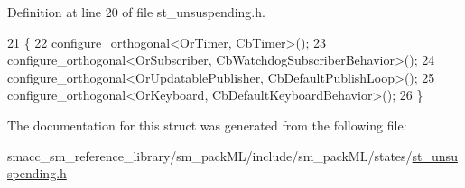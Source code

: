 Definition at line 20 of file st\+\_\+unsuspending.\+h.


\begin{DoxyCode}
21     \{
22         configure\_orthogonal<OrTimer, CbTimer>();   
23         configure\_orthogonal<OrSubscriber, CbWatchdogSubscriberBehavior>();
24         configure\_orthogonal<OrUpdatablePublisher, CbDefaultPublishLoop>();
25         configure\_orthogonal<OrKeyboard, CbDefaultKeyboardBehavior>();
26     \}
\end{DoxyCode}


The documentation for this struct was generated from the following file\+:\begin{DoxyCompactItemize}
\item 
smacc\+\_\+sm\+\_\+reference\+\_\+library/sm\+\_\+pack\+M\+L/include/sm\+\_\+pack\+M\+L/states/\hyperlink{st__unsuspending_8h}{st\+\_\+unsuspending.\+h}\end{DoxyCompactItemize}
